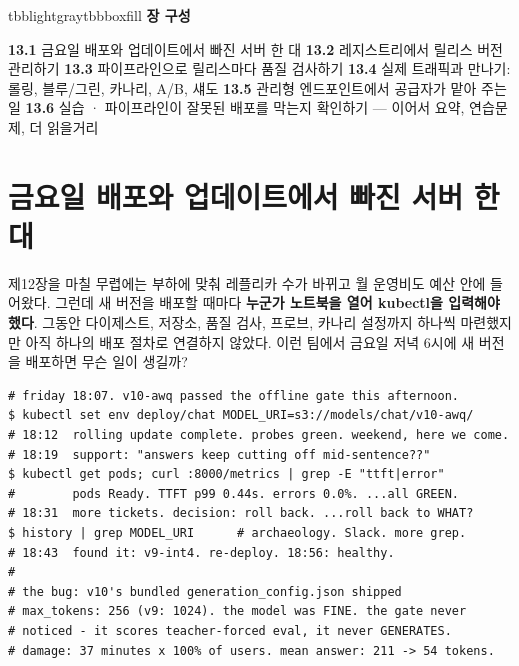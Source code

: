 \vspace{2.5pt}

\begin{calloutbox}{tbblightgray}{tbbboxfill}
{\normalsize\bfseries\color{tbbink}장 구성}\par\vspace{3pt}
\textbf{13.1} 금요일 배포와 업데이트에서 빠진 서버 한 대    \textbf{13.2} 레지스트리에서 릴리스 버전 관리하기    \textbf{13.3} 파이프라인으로 릴리스마다 품질 검사하기    \textbf{13.4} 실제 트래픽과 만나기: 롤링, 블루/그린, 카나리, A/B, 섀도    \textbf{13.5} 관리형 엔드포인트에서 공급자가 맡아 주는 일    \textbf{13.6} 실습 · 파이프라인이 잘못된 배포를 막는지 확인하기 — 이어서 요약, 연습문제, 더 읽을거리
\end{calloutbox}

\section{금요일 배포와 업데이트에서 빠진 서버 한 대}

제12장을 마칠 무렵에는 부하에 맞춰 레플리카 수가 바뀌고 월 운영비도 예산 안에 들어왔다. 그런데 새 버전을 배포할 때마다 \textbf{누군가 노트북을 열어 kubectl을 입력해야 했다}. 그동안 다이제스트, 저장소, 품질 검사, 프로브, 카나리 설정까지 하나씩 마련했지만 아직 하나의 배포 절차로 연결하지 않았다. 이런 팀에서 금요일 저녁 6시에 새 버전을 배포하면 무슨 일이 생길까?

\begin{terminalbox}
\begin{Verbatim}[breaklines=true,breakanywhere=true,fontsize=\small,formatcom=\color{tbbtermfg},codes=\tbbcodeactive]
# friday 18:07. v10-awq passed the offline gate this afternoon.
$ kubectl set env deploy/chat MODEL_URI=s3://models/chat/v10-awq/
# 18:12  rolling update complete. probes green. weekend, here we come.
# 18:19  support: "answers keep cutting off mid-sentence??"
$ kubectl get pods; curl :8000/metrics | grep -E "ttft|error"
#        pods Ready. TTFT p99 0.44s. errors 0.0%. ...all GREEN.
# 18:31  more tickets. decision: roll back. ...roll back to WHAT?
$ history | grep MODEL_URI      # archaeology. Slack. more grep.
# 18:43  found it: v9-int4. re-deploy. 18:56: healthy.
#
# the bug: v10's bundled generation_config.json shipped
# max_tokens: 256 (v9: 1024). the model was FINE. the gate never
# noticed - it scores teacher-forced eval, it never GENERATES.
# damage: 37 minutes x 100% of users. mean answer: 211 -> 54 tokens.
\end{Verbatim}
\end{terminalbox}

